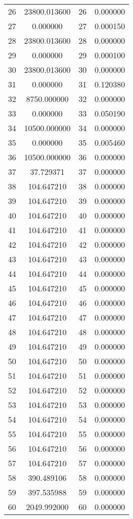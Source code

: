 \documentclass[12pt]{article}
\begin{document}
\begin{longtable}{@{}cccc@{}}
26 & 23800.013600 & 26 & 0.000000 \\
27 & 0.000000 & 27 & 0.000150 \\
28 & 23800.013600 & 28 & 0.000000 \\
29 & 0.000000 & 29 & 0.000100 \\
30 & 23800.013600 & 30 & 0.000000 \\
31 & 0.000000 & 31 & 0.120380 \\
32 & 8750.000000 & 32 & 0.000000 \\
33 & 0.000000 & 33 & 0.050190 \\
34 & 10500.000000 & 34 & 0.000000 \\
35 & 0.000000 & 35 & 0.005460 \\
36 & 10500.000000 & 36 & 0.000000 \\
37 & 37.729371 & 37 & 0.000000 \\
38 & 104.647210 & 38 & 0.000000 \\
39 & 104.647210 & 39 & 0.000000 \\
40 & 104.647210 & 40 & 0.000000 \\
41 & 104.647210 & 41 & 0.000000 \\
42 & 104.647210 & 42 & 0.000000 \\
43 & 104.647210 & 43 & 0.000000 \\
44 & 104.647210 & 44 & 0.000000 \\
45 & 104.647210 & 45 & 0.000000 \\
46 & 104.647210 & 46 & 0.000000 \\
47 & 104.647210 & 47 & 0.000000 \\
48 & 104.647210 & 48 & 0.000000 \\
49 & 104.647210 & 49 & 0.000000 \\
50 & 104.647210 & 50 & 0.000000 \\
51 & 104.647210 & 51 & 0.000000 \\
52 & 104.647210 & 52 & 0.000000 \\
53 & 104.647210 & 53 & 0.000000 \\
54 & 104.647210 & 54 & 0.000000 \\
55 & 104.647210 & 55 & 0.000000 \\
56 & 104.647210 & 56 & 0.000000 \\
57 & 104.647210 & 57 & 0.000000 \\
58 & 390.489106 & 58 & 0.000000 \\
59 & 397.535988 & 59 & 0.000000 \\
60 & 2049.992000 & 60 & 0.000000 \\

\end{longtable}
\end{document}
